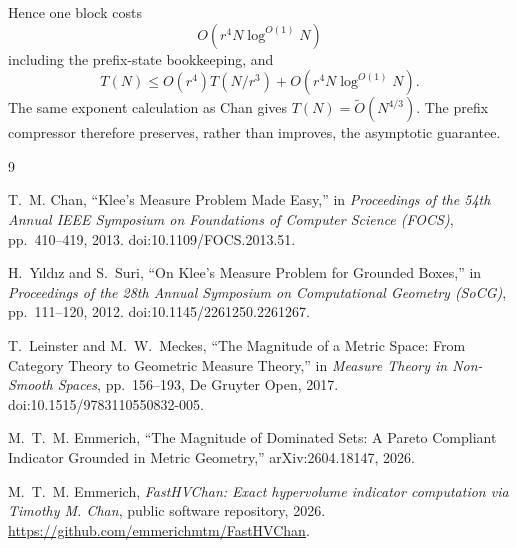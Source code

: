 \documentclass[12pt,a4paper]{article}
\theoremstyle{definition}
\newcommand{\1}{\mathbf 1}
\begin{document}
Hence one block costs
\[
O(r^4N\log^{O(1)}N)
\]
including the prefix-state bookkeeping, and
\[
T(N)\le O(r^4)T(N/r^3)+O(r^4N\log^{O(1)}N).
\]
The same exponent calculation as Chan gives $T(N)=\widetilde O(N^{4/3})$.  The prefix compressor therefore preserves, rather than improves, the asymptotic guarantee.

\begin{thebibliography}{9}

T.~M. Chan,
\newblock ``Klee's Measure Problem Made Easy,''
\newblock in \emph{Proceedings of the 54th Annual IEEE Symposium on Foundations of Computer Science (FOCS)}, pp.~410--419, 2013.
\newblock doi:10.1109/FOCS.2013.51.

H.~Y\i ld\i z and S.~Suri,
\newblock ``On Klee's Measure Problem for Grounded Boxes,''
\newblock in \emph{Proceedings of the 28th Annual Symposium on Computational Geometry (SoCG)}, pp.~111--120, 2012.
\newblock doi:10.1145/2261250.2261267.

T.~Leinster and M.~W.~Meckes,
\newblock ``The Magnitude of a Metric Space: From Category Theory to Geometric Measure Theory,''
\newblock in \emph{Measure Theory in Non-Smooth Spaces}, pp.~156--193, De Gruyter Open, 2017.
\newblock doi:10.1515/9783110550832-005.

M.~T.~M. Emmerich,
\newblock ``The Magnitude of Dominated Sets: A Pareto Compliant Indicator Grounded in Metric Geometry,''
\newblock arXiv:2604.18147, 2026.

M.~T.~M. Emmerich,
\newblock \emph{FastHVChan: Exact hypervolume indicator computation via Timothy M. Chan}, public software repository, 2026.
\newblock \url{https://github.com/emmerichmtm/FastHVChan}.

\end{thebibliography}
\end{document}
